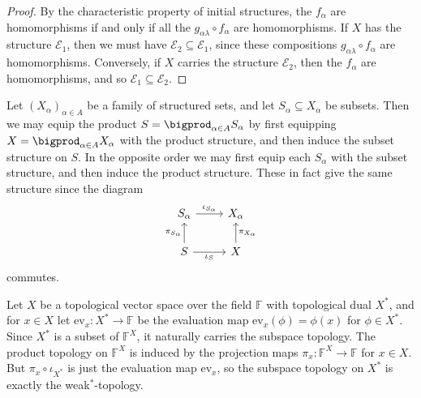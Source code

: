 \documentclass[article, a4paper, 11pt, oneside]{memoir}
\numberwithin{equation}{chapter}
\newcommand{\setF}{\mathbb{F}}
\newcommand{\ev}{\mathrm{ev}}
\newcommand{\calE}{\mathcal{E}}
\begin{document}
\begin{proof}
    By the characteristic property of initial structures, the $f_\alpha$ are homomorphisms if and only if all the $g_{\alpha\lambda} \circ f_\alpha$ are homomorphisms. If $X$ has the structure $\calE_1$, then we must have $\calE_2 \subseteq \calE_1$, since these compositions $g_{\alpha\lambda} \circ f_\alpha$ are homomorphisms. Conversely, if $X$ carries the structure $\calE_2$, then the $f_\alpha$ are homomorphisms, and so $\calE_1 \subseteq \calE_2$.
\end{proof}


\begin{examplebreak}
    Let $(X_\alpha)_{\alpha \in A}$ be a family of structured sets, and let $S_\alpha \subseteq X_\alpha$ be subsets. Then we may equip the product $S = \bigprod_{\alpha \in A} S_\alpha$ by first equipping $X = \bigprod_{\alpha \in A} X_\alpha$ with the product structure, and then induce the subset structure on $S$. In the opposite order we may first equip each $S_\alpha$ with the subset structure, and then induce the product structure. These in fact give the same structure since the diagram
    \begin{equation*}
        \begin{tikzcd}
            S_\alpha
                \ar[r, "\iota_{S_\alpha}"]
            & X_\alpha \\
            S  
                \ar[u, "\pi_{S_\alpha}"]
                \ar[r, "\iota_S", swap]
            & X
                \ar[u, "\pi_{X_\alpha}", swap]
        \end{tikzcd}
    \end{equation*}
    commutes.
\end{examplebreak}


\begin{examplebreak}
    Let $X$ be a topological vector space over the field $\setF$ with topological dual $X^*$, and for $x \in X$ let $\ev_x \colon X^* \to \setF$ be the evaluation map $\ev_x(\phi) = \phi(x)$ for $\phi \in X^*$. Since $X^*$ is a subset of $\setF^X$, it naturally carries the subspace topology. The product topology on $\setF^X$ is induced by the projection maps $\pi_x \colon \setF^X \to \setF$ for $x \in X$. But $\pi_x \circ \iota_{X^*}$ is just the evaluation map $\ev_x$, so the subspace topology on $X^*$ is exactly the weak${}^*$-topology.
\end{examplebreak}
\end{document}
